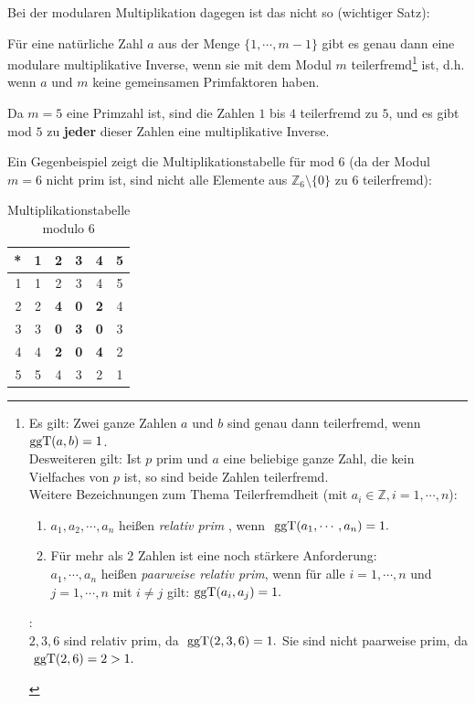 \begin{refsegment}
Bei der modularen Multiplikation dagegen ist das nicht so (wichtiger Satz):
\begin{satz}\label{thm-zth-multinv}
Für eine natürliche Zahl $a$ aus der Menge $\{1, \cdots, m-1\}$ gibt es genau
dann eine modulare multiplikative Inverse, wenn sie mit dem Modul
$m$ teilerfremd\footnote{%
  Es gilt: Zwei ganze Zahlen $a$ und $b$ sind genau dann teilerfremd, wenn ${\rm ggT}(a, b) = 1$.\\
  Desweiteren gilt: Ist $p$ prim und $a$ eine beliebige ganze Zahl, die kein
  Vielfaches von $p$ ist, so sind beide Zahlen teilerfremd.\\
  Weitere Bezeichnungen zum Thema Teilerfremdheit (mit $a_i \in \mathbb{Z},
  i=1, \cdots, n$):
  \begin{enumerate}
  \item $a_1,a_2, \cdots, a_n$ heißen {\em relativ prim}
    ,
    wenn $ {\rm~ggT}(a_1, \cdots , a_n) =1.$
  \item Für mehr als $2$ Zahlen  ist eine noch stärkere Anforderung:\\
    $a_1, \cdots , a_n$ heißen {\em paarweise relativ prim}, wenn für alle
    $i=1, \cdots, n$ und $j=1, \cdots , n$ mit $ i \neq j $ gilt:
    $ {\rm ggT} (a_i, a_j) =1. $
  \end{enumerate}
  \begin{example}{:}\\
  $2,3,6 $ sind relativ prim, da $ {\rm~ggT} (2,3,6)=1.$
  Sie sind nicht paarweise prim, da $ {\rm~ggT} (2,6)=2>1.$
  \end{example}
} ist, d.h. wenn $a$ und $m$ keine gemeinsamen Primfaktoren haben.
\end{satz}

Da $m=5$ eine Primzahl ist, sind die Zahlen $1$ bis $4$ teilerfremd zu $5$, und
es gibt mod $5$ zu \textbf{jeder} dieser Zahlen eine multiplikative Inverse.

Ein Gegenbeispiel zeigt die Multiplikationstabelle für mod $6$
(da der Modul $m = 6$ nicht prim ist, sind nicht alle Elemente aus
$\mathbb{Z}_6\setminus \{0\}$ zu $6$ teilerfremd):

\begin{table}[ht]
\begin{center}
\begin{tabular}{r|ccccc}
* &  1 & 2 & 3 & 4 & 5\\
\hline
1 &  1 & 2 & 3 & 4 & 5\\
2 &  2 & \textbf{4} & \textbf{0} & \textbf{2} & 4\\
3 &  3 & \textbf{0} & \textbf{3} & \textbf{0} & 3\\
4 &  4 & \textbf{2} & \textbf{0} & \textbf{4} & 2\\
5 &  5 & 4 & 3 & 2 & 1\\
\end{tabular}
\end{center}
\caption{Multiplikationstabelle modulo $6$}
\label{mulmod6}
\end{table}



\end{refsegment}
